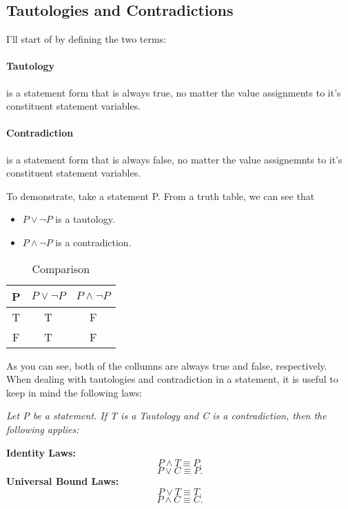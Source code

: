 \documentclass[a4paper]{article}
\begin{document}
\subsection{Tautologies and Contradictions}
I'll start of by defining the two terms:
\begin{tcolorbox}[title=Definition]
	\paragraph{Tautology} is a statement form that is always true, no matter the value assignments to it's constituent statement variables.
	\vspace{15pt}
	\paragraph{Contradiction} is a statement form that is always false, no matter the value assignemnts to it's constituent statement variables.
\end{tcolorbox}
\noindent To demonstrate, take a statement P. From a truth table, we can see that
\begin{itemize}
	\item $P \vee \neg P$ is a tautology.
\item  $P \wedge \neg P$ is a contradiction.
\end{itemize}

\begin{table}[htpb]
	\centering
	\caption{Comparison}
	\label{tab:label}
	\begin{tabular}{c|c|c}
		P & $P \vee \neg P$ &  $P \wedge \neg P$ \\ \hline
		T & T & F\\
		F & T & F \\
	\end{tabular}
\end{table}
\noindent As you can see, both of the collumns are always true and false, respectively.
When dealing with tautologies and contradiction in a statement, it is useful to keep in mind the following laws:

\begin{tcolorbox}
	\textit{Let P be a statement. If T is a Tautology and C is a contradiction, then the following applies:}
	
	\vspace{15pt}
	\textbf{Identity Laws:}\[
	P \wedge T \equiv P
	.\]\[
	P \vee C \equiv P
	.\] 
	\textbf{Universal Bound Laws:}\[
	P \vee T \equiv T
	.\]\[
	P \wedge C \equiv C
	.\]  
\end{tcolorbox}
\end{document}
